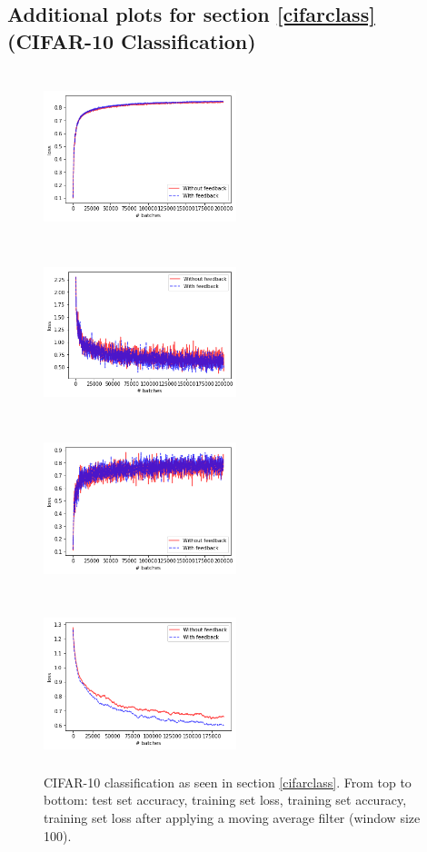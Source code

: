 \documentclass{article}
\begin{document}
\subsection{Additional plots for section \ref{cifarclass} (CIFAR-10 Classification)}
\begin{figure}[H]
      \centering
      \includegraphics[width=0.5\textwidth,height=5cm,keepaspectratio]{img/appendix/cifarclass/testacc.png}
      
      \includegraphics[width=0.5\textwidth,height=5cm,keepaspectratio]{img/appendix/cifarclass/trainloss.png}

	\includegraphics[width=0.5\textwidth,height=5cm,keepaspectratio]{img/appendix/cifarclass/trainacc.png}
	
	\includegraphics[width=0.5\textwidth,height=5cm,keepaspectratio]{img/appendix/cifarclass/trainlossma.png}


            \caption{CIFAR-10 classification as seen in section \ref{cifarclass}. From top to bottom: test set accuracy, training set loss, training set accuracy, training set loss after applying a moving average filter (window size 100). }
      \label{fig:addcifarclass}
  \end{figure}
\end{document}
